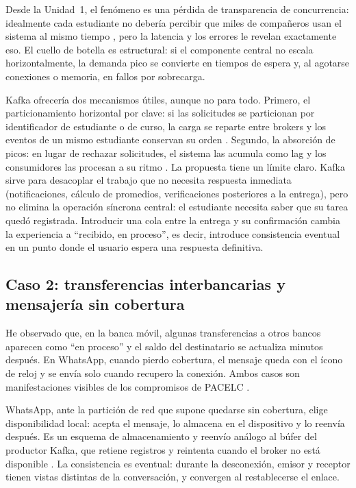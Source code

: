 \documentclass[11pt,a4paper]{article}
\begin{document}
Desde la Unidad~1, el fenómeno es una pérdida de transparencia de concurrencia: idealmente cada estudiante no debería percibir que miles de compañeros usan el sistema al mismo tiempo \cite{vansteen2023distributed}, pero la latencia y los errores le revelan exactamente eso. El cuello de botella es estructural: si el componente central no escala horizontalmente, la demanda pico se convierte en tiempos de espera y, al agotarse conexiones o memoria, en fallos por sobrecarga.

Kafka ofrecería dos mecanismos útiles, aunque no para todo. Primero, el particionamiento horizontal por clave: si las solicitudes se particionan por identificador de estudiante o de curso, la carga se reparte entre brokers y los eventos de un mismo estudiante conservan su orden \cite{raptis2023survey}. Segundo, la absorción de picos: en lugar de rechazar solicitudes, el sistema las acumula como lag y los consumidores las procesan a su ritmo \cite{calderon2024monitoring}. La propuesta tiene un límite claro. Kafka sirve para desacoplar el trabajo que no necesita respuesta inmediata (notificaciones, cálculo de promedios, verificaciones posteriores a la entrega), pero no elimina la operación síncrona central: el estudiante necesita saber que su tarea quedó registrada. Introducir una cola entre la entrega y su confirmación cambia la experiencia a \enquote{recibido, en proceso}, es decir, introduce consistencia eventual en un punto donde el usuario espera una respuesta definitiva.

\subsection{Caso 2: transferencias interbancarias y mensajería sin cobertura}

He observado que, en la banca móvil, algunas transferencias a otros bancos aparecen como \enquote{en proceso} y el saldo del destinatario se actualiza minutos después. En WhatsApp, cuando pierdo cobertura, el mensaje queda con el ícono de reloj y se envía solo cuando recupero la conexión. Ambos casos son manifestaciones visibles de los compromisos de PACELC \cite{abadi2012consistency}.

WhatsApp, ante la partición de red que supone quedarse sin cobertura, elige disponibilidad local: acepta el mensaje, lo almacena en el dispositivo y lo reenvía después. Es un esquema de almacenamiento y reenvío análogo al búfer del productor Kafka, que retiene registros y reintenta cuando el broker no está disponible \cite{kafkadocs}. La consistencia es eventual: durante la desconexión, emisor y receptor tienen vistas distintas de la conversación, y convergen al restablecerse el enlace.
\end{document}
